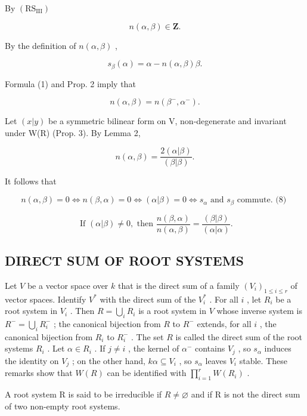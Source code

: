 By \((\mathrm{RS}_{\mathrm{III}})\)

\[
n (\alpha , \beta) \in \mathbf {Z}.\tag{4}
\]

By the definition of \(n(\alpha, \beta)\) ,

\[
s _ {\beta} (\alpha) = \alpha - n (\alpha , \beta) \beta .\tag{5}
\]

Formula (1) and Prop. 2 imply that

\[
n (\alpha , \beta) = n \left(\beta^ {-}, \alpha^ {-}\right).\tag{6}
\]

Let \((x|y)\) be a symmetric bilinear form on V, non-degenerate and invariant under W(R) (Prop. 3). By Lemma 2,

\[
n (\alpha , \beta) = \frac {2 (\alpha | \beta)}{(\beta | \beta)}.\tag{7}
\]

It follows that

\[
n (\alpha , \beta) = 0 \Longleftrightarrow n (\beta , \alpha) = 0 \Longleftrightarrow (\alpha | \beta) = 0 \Longleftrightarrow s _ {\alpha} \text {   and   } s _ {\beta} \text {   commute.   (8) }
\]

\[
\text {   If   } (\alpha | \beta) \neq 0, \text {   then   } \frac {n (\beta , \alpha)}{n (\alpha , \beta)} = \frac {(\beta | \beta)}{(\alpha | \alpha)}.\tag{9}
\]

\subsection{DIRECT SUM OF ROOT SYSTEMS}

Let \(V\) be a vector space over \(k\) that is the direct sum of a family \((V_i)_{1 \leqslant i \leqslant r}\) of vector spaces. Identify \(V^*\) with the direct sum of the \(V_i^*\) . For all \(i\) , let \(R_i\) be a root system in \(V_i\) . Then \(R = \bigcup_i R_i\) is a root system in \(V\) whose inverse system is \(R^- = \bigcup_i R_i^-\) ; the canonical bijection from \(R\) to \(R^-\) extends, for all \(i\) , the canonical bijection from \(R_i\) to \(R_i^-\) . The set \(R\) is called the direct sum of the root systems \(R_i\) . Let \(\alpha \in R_i\) . If \(j \neq i\) , the kernel of \(\alpha^-\) contains \(V_j\) , so \(s_\alpha\) induces the identity on \(V_j\) ; on the other hand, \(k\alpha \subseteq V_i\) , so \(s_\alpha\) leaves \(V_i\) stable. These remarks show that \(W(R)\) can be identified with \(\prod_{i=1}^{r} W(R_i)\) .

A root system R is said to be irreducible if \(R \neq \varnothing\) and if R is not the direct sum of two non-empty root systems.

